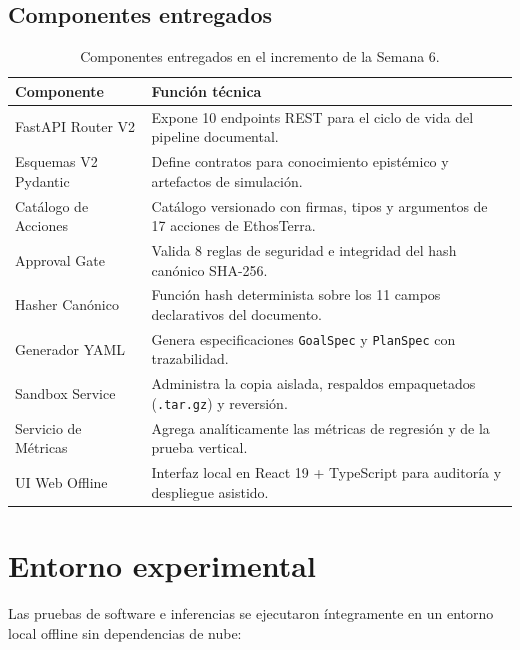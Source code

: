 \documentclass[11pt,a4paper]{article}
\begin{document}
\subsection{Componentes entregados}
\begin{table}[H]
\centering
\small
\begin{tabularx}{\textwidth}{lX}
\toprule
\textbf{Componente} & \textbf{Función técnica} \\
\midrule
FastAPI Router V2 & Expone 10 endpoints REST para el ciclo de vida del pipeline documental. \\
Esquemas V2 Pydantic & Define contratos para conocimiento epistémico y artefactos de simulación. \\
Catálogo de Acciones & Catálogo versionado con firmas, tipos y argumentos de 17 acciones de EthosTerra. \\
Approval Gate & Valida 8 reglas de seguridad e integridad del hash canónico SHA-256. \\
Hasher Canónico & Función hash determinista sobre los 11 campos declarativos del documento. \\
Generador YAML & Genera especificaciones \texttt{GoalSpec} y \texttt{PlanSpec} con trazabilidad. \\
Sandbox Service & Administra la copia aislada, respaldos empaquetados (\texttt{.tar.gz}) y reversión. \\
Servicio de Métricas & Agrega analíticamente las métricas de regresión y de la prueba vertical. \\
UI Web Offline & Interfaz local en React 19 + TypeScript para auditoría y despliegue asistido. \\
\bottomrule
\end{tabularx}
\caption{Componentes entregados en el incremento de la Semana 6.}
\label{tab:componentes}
\end{table}

\section{Entorno experimental}
Las pruebas de software e inferencias se ejecutaron íntegramente en un entorno local offline sin dependencias de nube:
\end{document}
